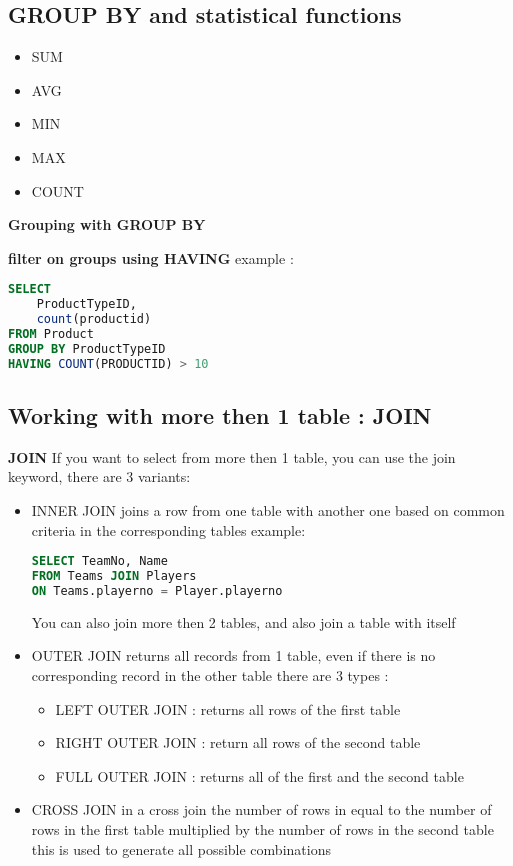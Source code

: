 \documentclass{report}
\begin{document}
	\subsection{GROUP BY and statistical functions}
	\begin{itemize}
		\item SUM
		\item AVG
		\item MIN 
		\item MAX
		\item COUNT	
	\end{itemize}
	
	\textbf{Grouping with GROUP BY}
	
	\textbf{filter on groups using HAVING}
	example : 
	\begin{lstlisting}[language=SQL]
SELECT
	ProductTypeID,
	count(productid)
FROM Product
GROUP BY ProductTypeID
HAVING COUNT(PRODUCTID) > 10\end{lstlisting}
	\subsection{Working with more then 1 table : JOIN}
	\textbf{JOIN}
	If you want to select from more then 1 table, you can use the join keyword, there are 3 variants: 
	\begin{itemize}
		\item INNER JOIN
		\subitem joins a row from one table with another one based on common criteria in the corresponding tables
		example: 
		\begin{lstlisting}[language=SQL]
SELECT TeamNo, Name
FROM Teams JOIN Players
ON Teams.playerno = Player.playerno\end{lstlisting}
		\subitem You can also join more then 2 tables, and also join a table with itself
		\item OUTER JOIN
		\subitem returns all records from 1 table, even if there is no corresponding record in the other table
		\subitem there are 3 types : 
		\begin{itemize}
			\item LEFT OUTER JOIN : returns all rows of the first table
			\item RIGHT OUTER JOIN  : return all rows of the second table
			\item FULL OUTER JOIN  : returns all of the first and the second table 
		\end{itemize}
		\item CROSS JOIN 
		\subitem in a cross join the number of rows in equal to the number of rows in the first table multiplied by the number of rows in the second table
		\subitem this is used to generate all possible combinations
	\end{itemize}
\end{document}
